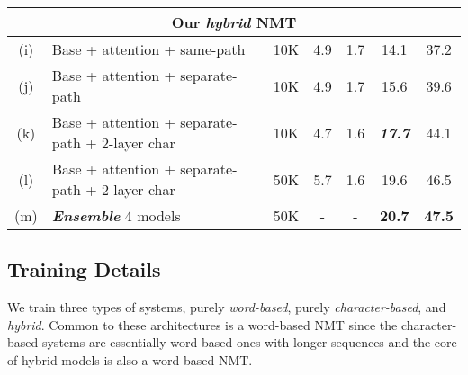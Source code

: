 \documentclass[11pt]{article}
\newcommand{\bi}[1]{\textbf{\textit{#1}}}
\newcommand{\unk}{$<${\it unk}$>$}
\newcommand{\ensbleu}{20.7}
\newcommand{\chr}{chrF$_3$}
\begin{document}
\begin{table*}
\begin{tabular}{c|l|c|c|c|c|c}
\multicolumn{7}{c}{Our {\it hybrid} NMT}\\
  \hline
(i) & Base + attention + same-path & 10K & 4.9 & 1.7 & 14.1 & 37.2 \\
(j) & Base + attention + separate-path & 10K & 4.9 & 1.7 & 15.6 & 39.6 \\
(k) & Base + attention + separate-path + 2-layer char & 10K & 4.7 & 1.6 & \bi{17.7} & 44.1 \\
  \hdashline
(l) & Base + attention + separate-path + 2-layer char & 50K & 5.7 & 1.6 & 19.6 & 46.5 \\
(m) & \bi{Ensemble} 4 models & 50K & - & - & {\bf \ensbleu{}} & {\bf 47.5} \\
\end{tabular}
\caption{{\bf WMT'15 English-Czech results} -- shown are 
the vocabulary sizes, perplexities, BLEU, and \chr{} scores of various systems on
{\it newstest2015}. Perplexities are listed under two
categories, word (w) and character (c). 
{\bf Best} and
\bi{important} results per
metric are highlighed.
}
\label{t:encs}
\end{table*}


\subsection{Training Details}
We train three types of systems, purely {\it word-based}, purely {\it
character-based}, and {\it hybrid}.
Common to these architectures is a word-based NMT since the
character-based systems are essentially word-based ones with
longer sequences and the core of hybrid models is also a word-based NMT.
\end{document}
